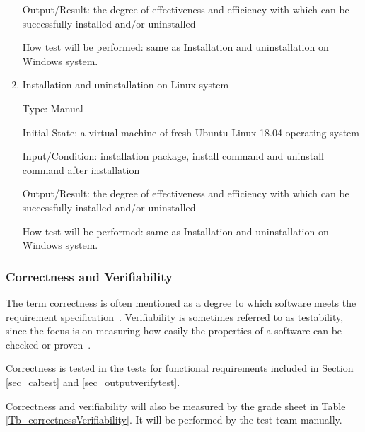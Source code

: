 \documentclass[12pt, titlepage]{article}
\begin{document}
\begin{enumerate}
Output/Result: the degree of effectiveness and efficiency with which
\progname{}can be successfully installed and/or uninstalled
					
How test will be performed: same as Installation and uninstallation on Windows
system.

\item{Installation and uninstallation on Linux system}

Type: Manual
					
Initial State: a virtual machine of fresh Ubuntu Linux 18.04 operating system
					
Input/Condition: \progname{} installation package, install command and
uninstall command after installation
					
Output/Result: the degree of effectiveness and efficiency with which
\progname{}can be successfully installed and/or uninstalled
					
How test will be performed: same as Installation and uninstallation on Windows
system.
\end{enumerate}


\subsubsection{Correctness and Verifiability} \label{sec_correctverfiabletest}

The term correctness is often mentioned as a degree to which software meets the
requirement specification~\cite{IEEE1990}.  Verifiability is sometimes referred
to as testability, since the focus is on measuring how easily the properties of
a software can be checked or proven~\cite{SmithEtAl2018}.
		
Correctness is tested in the tests for functional
requirements included in Section \ref{sec_caltest} and
\ref{sec_outputverifytest}. 

Correctness and verifiability will also be measured by the grade sheet in Table
\ref{Tb_correctnessVerifiability}. It will be performed by the test team
manually.
\end{document}
